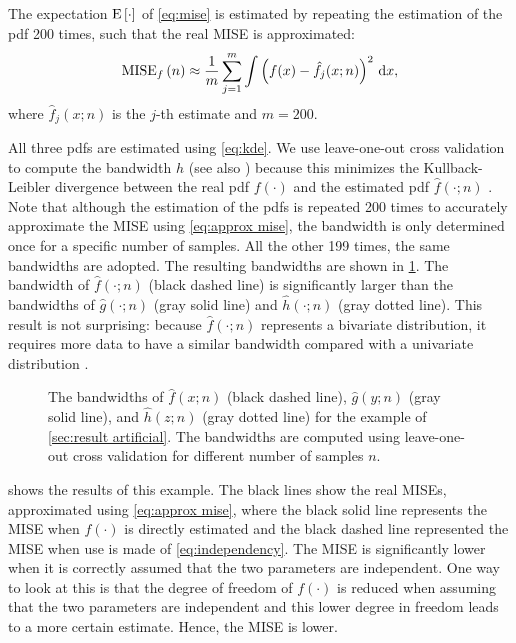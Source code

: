 The expectation $\textup{E} \left[ \cdot \right]$ of \cref{eq:mise} is estimated by repeating the estimation of the pdf 200 times, such that the real MISE is approximated:
\begin{equation}
	\label{eq:approx mise}
	\textup{MISE}_{f}\left( n \right) \approx \frac{1}{m} \sum_{j=1}^m \int \left( f(x) - \hat{f}_j(x;n)\right)^2 \mathrm{\,d} x,
\end{equation}
where $\hat{f}_j(x;n)$ is the $j$-th estimate and $m=200$. 

All three pdfs are estimated using \cref{eq:kde}. We use leave-one-out cross validation to compute the bandwidth $h$ (see also \textcite{duin1976parzen}) because this minimizes the Kullback-Leibler divergence between the real pdf $f(\cdot)$ and the estimated pdf $\hat{f}(\cdot;n)$ \cite{turlach1993bandwidthselection,zambom2013review}. Note that although the estimation of the pdfs is repeated 200 times to accurately approximate the MISE using \cref{eq:approx mise}, the bandwidth is only determined once for a specific number of samples. All the other 199 times, the same bandwidths are adopted. The resulting bandwidths are shown in \cref{fig:bandwidth}. The bandwidth of $\hat{f}(\cdot;n)$ (black dashed line) is significantly larger than the bandwidths of $\hat{g}(\cdot;n)$ (gray solid line) and $\hat{h}(\cdot;n)$ (gray dotted line). This result is not surprising: because $\hat{f}(\cdot;n)$ represents a bivariate distribution, it requires more data to have a similar bandwidth compared with a univariate distribution \cite{scott2005multidimensional}.

\setlength{}
\setlength{}
\begin{figure}
	\centering
	
	\caption{The bandwidths of $\hat{f}(x;n)$ (black dashed line), $\hat{g}(y;n)$ (gray solid line), and $\hat{h}(z;n)$ (gray dotted line) for the example of \cref{sec:result artificial}. The bandwidths are computed using leave-one-out cross validation for different number of samples $n$.}
	\label{fig:bandwidth}
\end{figure}

 shows the results of this example. The black lines show the real MISEs, approximated using \cref{eq:approx mise}, where the black solid line represents the MISE when $f(\cdot)$ is directly estimated and the black dashed line represented the MISE when use is made of \cref{eq:independency}. The MISE is significantly lower when it is correctly assumed that the two parameters are independent. One way to look at this is that the degree of freedom of $f(\cdot)$ is reduced when assuming that the two parameters are independent and this lower degree in freedom leads to a more certain estimate. Hence, the MISE is lower.

